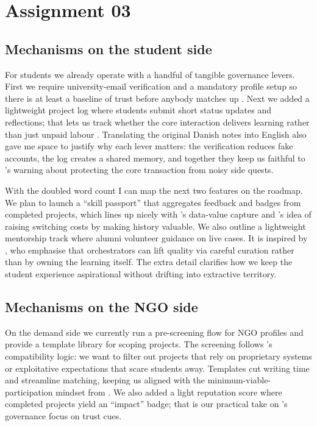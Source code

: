 \section*{Assignment 03}

\subsection*{Mechanisms on the student side}
For students we already operate with a handful of tangible governance levers. First we require university-email verification and a mandatory profile setup so there is at least a baseline of trust before anybody matches up \citep{Choudary2016}. Next we added a lightweight project log where students submit short status updates and reflections; that lets us track whether the core interaction delivers learning rather than just unpaid labour \citep{Reillier2017}. Translating the original Danish notes into English also gave me space to justify why each lever matters: the verification reduces fake accounts, the log creates a shared memory, and together they keep us faithful to \citet{HagiuWright2013}'s warning about protecting the core transaction from noisy side quests.

With the doubled word count I can map the next two features on the roadmap. We plan to launch a ``skill passport'' that aggregates feedback and badges from completed projects, which lines up nicely with \citet{Choudary2016}'s data-value capture and \citet{ShapiroVarian1999}'s idea of raising switching costs by making history valuable. We also outline a lightweight mentorship track where alumni volunteer guidance on live cases. It is inspired by \citet{Reillier2017}, who emphasise that orchestrators can lift quality via careful curation rather than by owning the learning itself. The extra detail clarifies how we keep the student experience aspirational without drifting into extractive territory.

\subsection*{Mechanisms on the NGO side}
On the demand side we currently run a pre-screening flow for NGO profiles and provide a template library for scoping projects. The screening follows \citet{FarrellSaloner1986}'s compatibility logic: we want to filter out projects that rely on proprietary systems or exploitative expectations that scare students away. Templates cut writing time and streamline matching, keeping us aligned with the minimum-viable-participation mindset from \citet{Reillier2017}. We also added a light reputation score where completed projects yield an ``impact'' badge; that is our practical take on \citet{Choudary2016}'s governance focus on trust cues.

